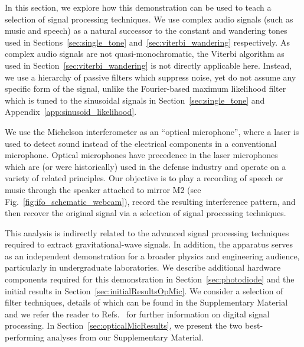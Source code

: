 \documentclass[paper-main.tex]{subfiles}
\begin{document}
In this section, we explore how this demonstration can be used to teach a selection of signal processing techniques. 
We use complex audio signals (such as music and speech) as a natural successor to the constant and wandering tones used in Sections~\ref{sec:single_tone} and~\ref{sec:viterbi_wandering} respectively.
As complex audio signals are not quasi-monochromatic, the Viterbi algorithm as used in Section~\ref{sec:viterbi_wandering} is not directly applicable here. 
Instead, we use a hierarchy of passive filters which suppress noise, yet do not assume any specific form of the signal, unlike the Fourier-based maximum likelihood filter which is tuned to the sinusoidal signals in Section~\ref{sec:single_tone} and Appendix~\ref{app:sinusoid_likelihood}.

We use the Michelson interferometer as an ``optical microphone'', where a laser is used to detect sound instead of the electrical components in a conventional microphone.
Optical microphones have precedence in the laser microphones~\cite{laser_microphone} which are (or were historically) used in the defense industry and operate on a variety of related principles. 
Our objective is to play a recording of speech or music through the speaker attached to mirror M2 (see Fig.~\ref{fig:ifo_schematic_webcam}), record the resulting interference pattern, and then recover the original signal via a selection of signal processing techniques. 


This analysis is indirectly related to the advanced signal processing techniques required to extract gravitational-wave signals. 
In addition, the apparatus serves as an independent demonstration for a broader physics and engineering audience, particularly in undergraduate laboratories. 
We describe additional hardware components required for this demonstration in Section~\ref{sec:photodiode} and the initial results in Section~\ref{sec:initialResultsOpMic}. 
We consider a selection of filter techniques, details of which can be found in the Supplementary Material and we refer the reader to Refs.~\cite{Mitra:2011, Lyons:2011, Stein:2000, OpenheimSchaferBuck:1999, PrakisManolakis:1996,10.5555/151045} for further information on digital signal processing. 
In Section~\ref{sec:opticalMicResults}, we present the two best-performing analyses from our Supplementary Material. 
\end{document}
